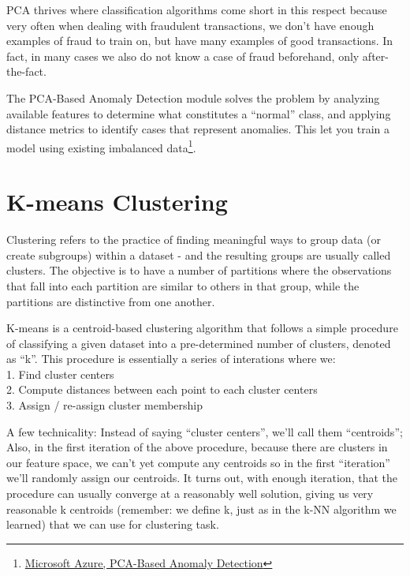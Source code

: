 \documentclass[]{article}
\begin{document}
PCA thrives where classification algorithms come short in this respect
because very often when dealing with fraudulent transactions, we don't
have enough examples of fraud to train on, but have many examples of
good transactions. In fact, in many cases we also do not know a case of
fraud beforehand, only after-the-fact.

The PCA-Based Anomaly Detection module solves the problem by analyzing
available features to determine what constitutes a ``normal'' class, and
applying distance metrics to identify cases that represent anomalies.
This let you train a model using existing imbalanced data\footnote{\href{https://docs.microsoft.com/en-us/azure/machine-learning/studio-module-reference/pca-based-anomaly-detection}{Microsoft
  Azure, PCA-Based Anomaly Detection}}.

\hypertarget{k-means-clustering}{%
\section{K-means Clustering}\label{k-means-clustering}}

Clustering refers to the practice of finding meaningful ways to group
data (or create subgroups) within a dataset - and the resulting groups
are usually called clusters. The objective is to have a number of
partitions where the observations that fall into each partition are
similar to others in that group, while the partitions are distinctive
from one another.

K-means is a centroid-based clustering algorithm that follows a simple
procedure of classifying a given dataset into a pre-determined number of
clusters, denoted as ``k''. This procedure is essentially a series of
interations where we:\\
1. Find cluster centers\\
2. Compute distances between each point to each cluster centers\\
3. Assign / re-assign cluster membership

A few technicality: Instead of saying ``cluster centers'', we'll call
them ``centroids''; Also, in the first iteration of the above procedure,
because there are clusters in our feature space, we can't yet compute
any centroids so in the first ``iteration'' we'll randomly assign our
centroids. It turns out, with enough iteration, that the procedure can
usually converge at a reasonably well solution, giving us very
reasonable k centroids (remember: we define k, just as in the k-NN
algorithm we learned) that we can use for clustering task.
\end{document}
